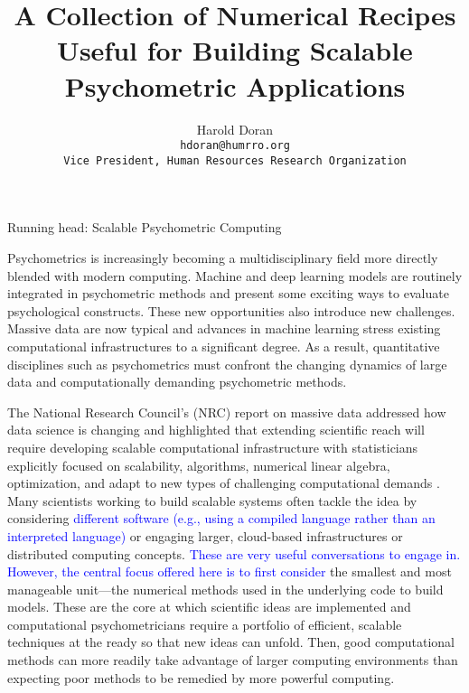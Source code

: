 \documentclass[12pt]{article}
\title{A Collection of Numerical Recipes Useful for Building Scalable Psychometric Applications}
\author{Harold Doran\\
	\texttt{hdoran@humrro.org}\\
	\texttt{Vice President, Human Resources Research Organization}\\
	}
\begin{document}
 
\baselineskip 24pt %
Running head: Scalable Psychometric Computing

Psychometrics is increasingly becoming a multidisciplinary field more directly blended with modern computing. Machine and deep learning models are routinely integrated in psychometric methods and present some exciting ways to evaluate psychological constructs. These new opportunities also introduce new challenges. Massive data are now typical and advances in machine learning stress existing computational infrastructures to a significant degree. As a result, quantitative disciplines such as psychometrics must confront the changing dynamics of large data and computationally demanding psychometric methods. 

The National Research Council's (NRC) report on massive data addressed how data science is changing and highlighted that extending scientific reach will require developing scalable computational infrastructure with statisticians explicitly focused on scalability, algorithms, numerical linear algebra, optimization, and adapt to new types of challenging computational demands \cite{massive}. Many scientists working to build scalable systems often tackle the idea by considering \textcolor{blue}{different software (e.g., using a compiled language rather than an interpreted language)} or engaging larger, cloud-based infrastructures or distributed computing concepts. \textcolor{blue}{These are very useful conversations to engage in. However, the central focus offered here is to first consider} the smallest and most manageable unit---the numerical methods used in the underlying code to build models. These are the core at which scientific ideas are implemented and computational psychometricians require a portfolio of efficient, scalable techniques at the ready so that new ideas can unfold. Then, good computational methods can more readily take advantage of larger computing environments than expecting poor methods to be remedied by more powerful computing. 
\end{document}
